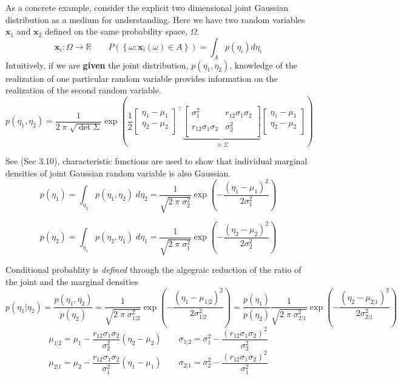\documentclass{article}         %
\theoremstyle{definition}
\theoremstyle{remark}
\begin{document}
As a concrete example, consider the explicit two dimensional joint Gaussian
distribution as a medium for understanding. Here we have two random
variables $\mathbf{x}_1$ and $\mathbf{x}_2$ defined on the same probability
space, $\Omega$.
\[
\mathbf{x}_i: \Omega \rightarrow \mathbb{R}
\qquad
P\left( \left\{ \omega: 
\mathbf{x}_i (\omega) \in A
 \right\}\right)
=
\int_A p(\eta_i) d\eta_i
\]
Intuitively, if we are \textbf{given} the joint distribution,
$p(\eta_1,\eta_2)$, knowledge of the realization of one particular random
variable provides information on the realization of the second random
variable.
\[
      p(\eta_1,\eta_2)  = \frac{1}{2 \; \pi \; \sqrt{\det{\Sigma}}}
\exp\left( \frac{1}{2}
\begin{bmatrix}
\eta_1 - \mu_1 \\
\eta_2 - \mu_2 \\
\end{bmatrix}^\top
\underbrace{
\begin{bmatrix}
       \sigma_1^2        & r_{12} \sigma_1 \sigma_2 \\
r_{12} \sigma_1 \sigma_2 &          \sigma_2^2 \\
\end{bmatrix}
}_{\equiv \Sigma}
\begin{bmatrix}
\eta_1 - \mu_1 \\
\eta_2 - \mu_2 \\
\end{bmatrix}
\right)
\]

See \cite{maybeck1979stochastic} (Sec 3.10), characteristic functions 
are used to show that individual marginal
densities of joint  Gaussian random variable is also Gaussian.
\[
p(\eta_1) = 
\int_{\eta_2}
      p(\eta_1,\eta_2)
\;d\eta_2
 = \frac{1}{ \sqrt{2 \; \pi \; \sigma_2^2}} \exp\left( - \frac{(\eta_1 -
\mu_1)^2}{2 \sigma_1^2} \right)
\]

\[
p(\eta_2) = 
\int_{\eta_1}
      p(\eta_2,\eta_1)
\;d\eta_1
 = \frac{1}{ \sqrt{2 \; \pi \; \sigma_1^2}} \exp\left( - \frac{(\eta_2 -
\mu_2)^2}{2 \sigma_2^2} \right)
\]

Conditional probablity is \textit{defined} through the algegraic
reduction of the ratio of the joint and the marginal densities
\[
p(\eta_1|\eta_2) =  \frac{p(\eta_1,\eta_2)  }{p(\eta_2) }
 = \frac{1}{ \sqrt{2 \; \pi \; \sigma_{1|2}^2}}
    \exp\left( - \frac{(\eta_1 - \mu_{1|2})^2}{2 \sigma_{1|2}^2} \right)
 = 
\frac{p(\eta_1)}{p(\eta_2)}
   \frac{1}{ \sqrt{2 \; \pi \; \sigma_{2|1}^2}}
    \exp\left( - \frac{(\eta_2 - \mu_{2|1})^2}{2 \sigma_{2|1}^2} \right)
\]
\[
\mu_{1|2} =  \mu_1 - 
       \frac{r_{12} \sigma_1 \sigma_2 }{\sigma_2^2}
       (\eta_2 - \mu_2)
\qquad
\sigma_{1|2} = 
\sigma_1^2  - 
       \frac{(r_{12} \sigma_1 \sigma_2 )^2}{\sigma_2^2}
\]
\[
\mu_{2|1} =  \mu_2 - 
       \frac{r_{12} \sigma_1 \sigma_2 }{\sigma_1^2}
       (\eta_1 - \mu_1)
\qquad
\sigma_{2|1} = 
\sigma_2^2  - 
       \frac{(r_{12} \sigma_1 \sigma_2 )^2}{\sigma_1^2}
\]
\end{document}
